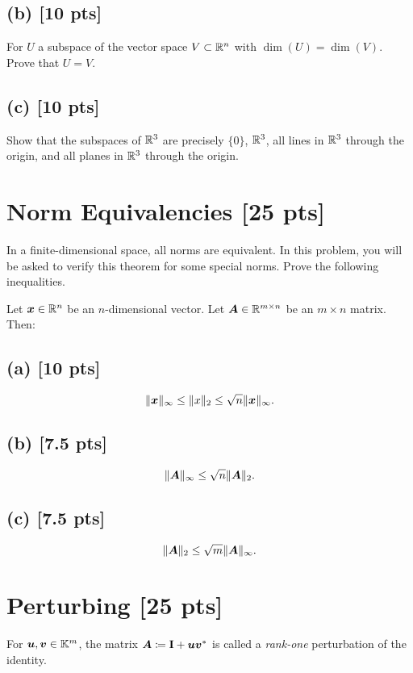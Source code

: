 \documentclass[twoside,10pt]{article}
\begin{document}
\subsection*{(b) [10 pts]}
For $U$ a subspace of the vector space $V \subset \mathbb{R}^n$ with $\dim(U) = \dim(V)$. Prove that $U = V$.

\subsection*{(c) [10 pts]}
Show that the subspaces of $\mathbb{R}^3$ are precisely $\{0\}$, $\mathbb{R}^{3}$, all lines in $\mathbb{R}^3$ through the origin, and all planes in $\mathbb{R}^3$ through the origin.

\section{Norm Equivalencies [25 pts]}
In a finite-dimensional space, all norms are equivalent. In this problem, you will be asked to verify this theorem for some special norms. Prove the following inequalities. 

Let $\bm{x} \in \mathbb{R}^n$ be an $n$-dimensional vector. Let $\bm{A} \in \mathbb{R}^{m \times n}$ be an $m \times n$ matrix. Then: 

\subsection*{(a) [10 pts]}
\begin{equation*}
  \|\bm{x}\|_{\infty} \leq \|x\|_2 \leq \sqrt{n}\|\bm{x}\|_{\infty}.
\end{equation*}

\subsection*{(b) [7.5 pts]}
\begin{equation*}
  \|\bm{A}\|_{\infty} \leq \sqrt{n}\|\bm{A}\|_2.
\end{equation*}

\subsection*{(c) [7.5 pts]}
\begin{equation*}
  \|\bm{A}\|_{2} \leq \sqrt{m}\|\bm{A}\|_{\infty}.
\end{equation*}

\section{Perturbing [25 pts]}
For $\bm{u}, \bm{v} \in \mathbb{K}^m$, the matrix $\bm{A} \coloneqq \mathbf{I} + \bm{u}\bm{v}^{*}$ is called a \emph{rank-one} perturbation of the identity. 
\end{document}
